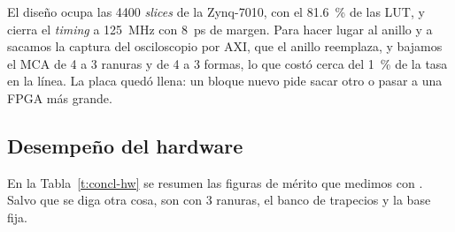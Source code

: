 El diseño ocupa las 4400 \emph{slices} de la Zynq-7010, con el \qty{81.6}{\percent} de
las LUT, y cierra el \emph{timing} a \qty{125}{\mega\hertz} con
\qty{8}{\pico\second} de margen. Para hacer lugar al anillo y a
 sacamos la captura del osciloscopio por AXI, que el anillo
reemplaza, y bajamos el MCA de 4 a 3 ranuras y de 4 a 3 formas, lo que costó
cerca del \qty{1}{\percent} de la tasa en la línea. La placa quedó llena: un
bloque nuevo pide sacar otro o pasar a una FPGA más grande.

\subsection{Desempeño del hardware}
\label{S:concl-hw}

En la Tabla~\ref{t:concl-hw} se resumen las figuras de mérito que medimos con
. Salvo que se diga otra cosa, son con 3 ranuras, el banco
de trapecios y la base fija.

